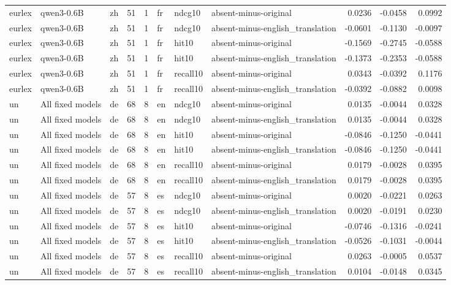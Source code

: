 \begin{tabular}{lllrrlllrrr}
eurlex & qwen3-0.6B & zh & 51 & 1 & fr & ndcg10 & absent-minus-original & 0.0236 & -0.0458 & 0.0992 \\
eurlex & qwen3-0.6B & zh & 51 & 1 & fr & ndcg10 & absent-minus-english\_translation & -0.0601 & -0.1130 & -0.0097 \\
eurlex & qwen3-0.6B & zh & 51 & 1 & fr & hit10 & absent-minus-original & -0.1569 & -0.2745 & -0.0588 \\
eurlex & qwen3-0.6B & zh & 51 & 1 & fr & hit10 & absent-minus-english\_translation & -0.1373 & -0.2353 & -0.0588 \\
eurlex & qwen3-0.6B & zh & 51 & 1 & fr & recall10 & absent-minus-original & 0.0343 & -0.0392 & 0.1176 \\
eurlex & qwen3-0.6B & zh & 51 & 1 & fr & recall10 & absent-minus-english\_translation & -0.0392 & -0.0882 & 0.0098 \\
un & All fixed models & de & 68 & 8 & en & ndcg10 & absent-minus-original & 0.0135 & -0.0044 & 0.0328 \\
un & All fixed models & de & 68 & 8 & en & ndcg10 & absent-minus-english\_translation & 0.0135 & -0.0044 & 0.0328 \\
un & All fixed models & de & 68 & 8 & en & hit10 & absent-minus-original & -0.0846 & -0.1250 & -0.0441 \\
un & All fixed models & de & 68 & 8 & en & hit10 & absent-minus-english\_translation & -0.0846 & -0.1250 & -0.0441 \\
un & All fixed models & de & 68 & 8 & en & recall10 & absent-minus-original & 0.0179 & -0.0028 & 0.0395 \\
un & All fixed models & de & 68 & 8 & en & recall10 & absent-minus-english\_translation & 0.0179 & -0.0028 & 0.0395 \\
un & All fixed models & de & 57 & 8 & es & ndcg10 & absent-minus-original & 0.0020 & -0.0221 & 0.0263 \\
un & All fixed models & de & 57 & 8 & es & ndcg10 & absent-minus-english\_translation & 0.0020 & -0.0191 & 0.0230 \\
un & All fixed models & de & 57 & 8 & es & hit10 & absent-minus-original & -0.0746 & -0.1316 & -0.0241 \\
un & All fixed models & de & 57 & 8 & es & hit10 & absent-minus-english\_translation & -0.0526 & -0.1031 & -0.0044 \\
un & All fixed models & de & 57 & 8 & es & recall10 & absent-minus-original & 0.0263 & -0.0005 & 0.0537 \\
un & All fixed models & de & 57 & 8 & es & recall10 & absent-minus-english\_translation & 0.0104 & -0.0148 & 0.0345 \\

\end{tabular}
